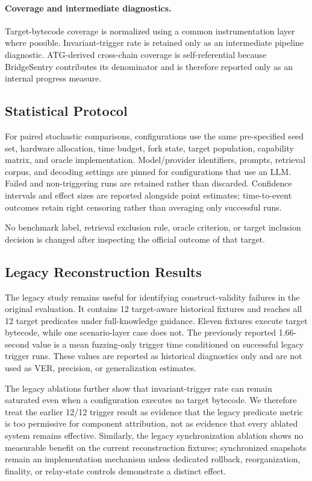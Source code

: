 \paragraph{Coverage and intermediate diagnostics.}
Target-bytecode coverage is normalized using a common instrumentation layer where possible. Invariant-trigger rate is retained only as an intermediate pipeline diagnostic. ATG-derived cross-chain coverage is self-referential because BridgeSentry contributes its denominator and is therefore reported only as an internal progress measure.

\subsection{Statistical Protocol}

For paired stochastic comparisons, configurations use the same pre-specified seed set, hardware allocation, time budget, fork state, target population, capability matrix, and oracle implementation. Model/provider identifiers, prompts, retrieval corpus, and decoding settings are pinned for configurations that use an LLM. Failed and non-triggering runs are retained rather than discarded. Confidence intervals and effect sizes are reported alongside point estimates; time-to-event outcomes retain right censoring rather than averaging only successful runs.

No benchmark label, retrieval exclusion rule, oracle criterion, or target inclusion decision is changed after inspecting the official outcome of that target.

\subsection{Legacy Reconstruction Results}

The legacy study remains useful for identifying construct-validity failures in the original evaluation. It contains 12 target-aware historical fixtures and reaches all 12 target predicates under full-knowledge guidance. Eleven fixtures execute target bytecode, while one scenario-layer case does not. The previously reported 1.66-second value is a mean fuzzing-only trigger time conditioned on successful legacy trigger runs. These values are reported as historical diagnostics only and are not used as VER, precision, or generalization estimates.

The legacy ablations further show that invariant-trigger rate can remain saturated even when a configuration executes no target bytecode. We therefore treat the earlier 12/12 trigger result as evidence that the legacy predicate metric is too permissive for component attribution, not as evidence that every ablated system remains effective. Similarly, the legacy synchronization ablation shows no measurable benefit on the current reconstruction fixtures; synchronized snapshots remain an implementation mechanism unless dedicated rollback, reorganization, finality, or relay-state controls demonstrate a distinct effect.
